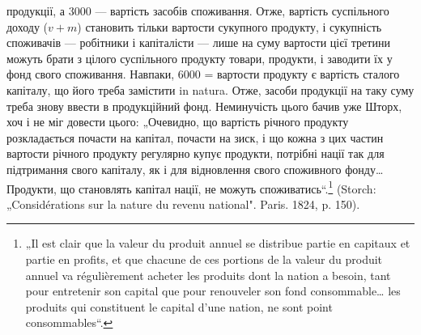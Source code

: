 \parcont{}  %
продукції, а 3000 — вартість засобів споживання. Отже, вартість суспільного
доходу ($v + m$) становить тільки  вартости сукупного продукту,
і сукупність споживачів — робітники і капіталісти — лише на суму вартости
цієї третини можуть брати з цілого суспільного продукту товари,
продукти, і заводити їх у фонд свого споживання. Навпаки, 6000 = 
вартости продукту є вартість сталого капіталу, що його треба замістити
in natura. Отже, засоби продукції на таку суму треба знову ввести в
продукційний фонд. Неминучість цього бачив уже Шторх, хоч і не міг
довести цього: „Очевидно, що вартість річного продукту розкладається
почасти на капітал, почасти на зиск, і що кожна з цих частин вартости річного
продукту регулярно купує продукти, потрібні нації так для підтримання
свого капіталу, як і для відновлення свого споживного фонду\dots{} Продукти,
що становлять капітал нації, не можуть споживатись“.\footnote*{
„Il est clair que la valeur du produit annuel se distribue partie en capitaux
et partie en profits, et que chacune de ces portions de la valeur du produit annuel
va régulièrement acheter les produits dont la nation a besoin, tant pour entretenir
son capital que pour renouveler son fond consommable\dots{} les produits qui constituent
le capital d’une nation, ne sont point consommables“.
} (Storch:
„Considérations sur la nature du revenu national". Paris. 1824, p. 150).

